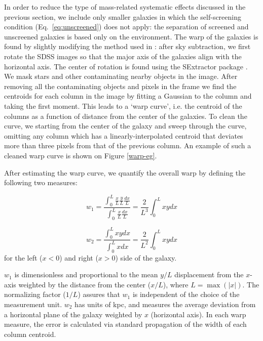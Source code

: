 \documentclass[twocolappendix, numberedappendix]{emulateapj}
\begin{document}
In order to reduce the type of mass-related systematic effects discussed in
the previous  section, we include only smaller galaxies in which the
self-screening condition (Eq.\ \ref{eq:unscreened}) does not apply: the
separation of screened and
unscreened galaxies is based only on the environment.
The warp of the galaxies is found by slightly modifying the method used
in \citet{jim97}: after sky subtraction, we first rotate the SDSS images
so that the major axis of the galaxies align with the horizontal axis.
The center of rotation is found using the SExtractor package \citep{bertin96}.
We mask stars and other contaminating
nearby objects in the image. After removing all the contaminating objects and
pixels in the frame we find the centroids
for each column in the image by fitting a Gaussian to the column and taking the
first moment. This leads to a `warp curve', i.e. the centroid of the
columns as a function of distance from the center of the galaxies.
To clean the curve, we starting from the center of the galaxy and
sweep through the curve, omitting any column which has a linearly-interpolated
centroid that deviates more than three pixels from that of the previous column.
An example of such a cleaned warp curve is shown on Figure \ref{warp-eg}.


After estimating the warp curve, we quantify the overall
warp by defining the following two measures:

\begin{equation}
w_1 =  \frac{\int_0^L \frac{x}{L} \frac{y}{L} \frac{dx}{L}}{\int_0^L
\frac{x}{L}\frac{dx}{L}}=\frac{2}{L^3} \int_0^L x y dx
\label{warp-param} 
\end{equation}

\begin{equation}
w_2 = \frac{\int_0^L{x y dx}}{\int_0^L{x dx}}=\frac{2}{L^2} \int_0^L x y dx
\label{warp-param2} 
\end{equation} 
for the left ($x < 0$) and right ($x > 0$) side of the galaxy.

$w_1$ is dimensionless and proportional to the mean $y/L$ displacement from the
$x$-axis weighted by the distance from the center ($x/L$),
where $L = \max(|x|)$.
The normalizing factor ($1/L$) assures that $w_1$ is independent
of the choice of the measurement unit.
$w_2$ has units of kpc, and measures the average deviation from a
horizontal plane of the galaxy weighted by $x$ (horizontal axis).
In each warp measure, the error is calculated via standard propagation
of the width of each column centroid.
\end{document}
